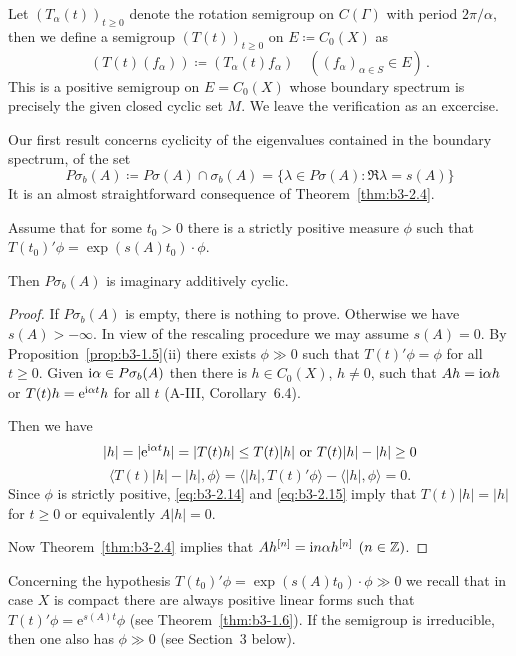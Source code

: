 \begin{examples}
\begin{enumerate}[\upshape (i), wide, labelindent=.5em]
	Let $(T_{\alpha}(t))_{t \geq 0}$ denote the rotation semigroup on $C(\Gamma)$ with period $2\pi/\alpha$, then we define a semigroup $(T(t))_{t \geq 0}$ on $E \coloneqq C_{0}(X)$ as
	\[
	(T(t)(f_{\alpha})) \coloneqq (T_{\alpha}(t)f_{\alpha}) \quad ((f_{\alpha})_{\alpha \in S} \in E)\,.
	\]
	This is a positive semigroup on $E = C_{0}(X)$ whose boundary spectrum is precisely the given closed cyclic set $M$.
	We leave the verification as an excercise.
	
\end{enumerate}
\end{examples}
Our first result concerns cyclicity of the eigenvalues contained in the boundary spectrum, \ie of the set
	\[
	P\sigma_{b}(A) \coloneqq P\sigma(A) \cap \sigma_{b}(A) = \{\lambda \in P\sigma(A) \colon \Re\lambda  = s(A)\}
	\]
	It is an almost straightforward consequence of Theorem~\ref{thm:b3-2.4}.
	\begin{proposition}\label{prop:b3-2.7}
		
		Assume that for some $t_{0} > 0$ there is a strictly positive measure $\phi$ such that $T(t_{0})'\phi = \exp(s(A)t_{0})\cdot\phi$.
		
		Then $P\sigma_{b}(A)$ is imaginary additively cyclic.
	\end{proposition}
\begin{proof}
If $P\sigma_{b}(A)$ is empty, there is nothing to prove.
Otherwise we have $s(A) > -\infty$.
In view of the rescaling procedure we may assume $s(A) = 0$.
By Proposition~\ref{prop:b3-1.5}(ii) there exists $\phi \gg 0$ such that $T(t)'\phi = \phi$ for all $t \geq 0$.
Given $\mathrm{i} \alpha \in P\sigma_{b}(A)$ then there is $h \in C_{0}(X)$, $h \neq 0$, such that $Ah = \mathrm{i}\alpha h$ or $T(t)h = \mathrm{e}^{\mathrm{i}\alpha t}h$ for all $t$ (A-III, Corollary~6.4).

	Then we have
	\begin{equation}\label{eq:b3-2.14}
		|h| = |\mathrm{e}^{\mathrm{i}\alpha t}h| = |T(t)h| \leq T(t)|h| \text{ or } T(t)|h| - |h| \geq 0
	\end{equation}
	\begin{equation}\label{eq:b3-2.15}
		\langle T(t)|h| - |h|,\phi \rangle = \langle |h|,T(t)'\phi \rangle - \langle |h|,\phi \rangle = 0.
	\end{equation}
	Since $\phi$ is strictly positive, \eqref{eq:b3-2.14}  and \eqref{eq:b3-2.15} imply that $T(t)|h| = |h|$ for $t \geq 0$ or equivalently $A|h| = 0$.
	
	Now Theorem~\ref{thm:b3-2.4} implies that $Ah^{[n]} = \mathrm{i} n\alpha h^{[n]}$ $(n \in \mathbb{Z})$.
\end{proof}
Concerning the hypothesis $T(t_{0})'\phi = \exp(s(A)t_{0})\cdot\phi \gg 0$ we recall that in case $X$ is compact there are always positive linear forms such that $T(t)'\phi = \mathrm{e}^{s(A)t}\phi$ (see Theorem~\ref{thm:b3-1.6}).
If the semigroup is irreducible, then one also has $\phi \gg 0$ (see Section~3 below).

